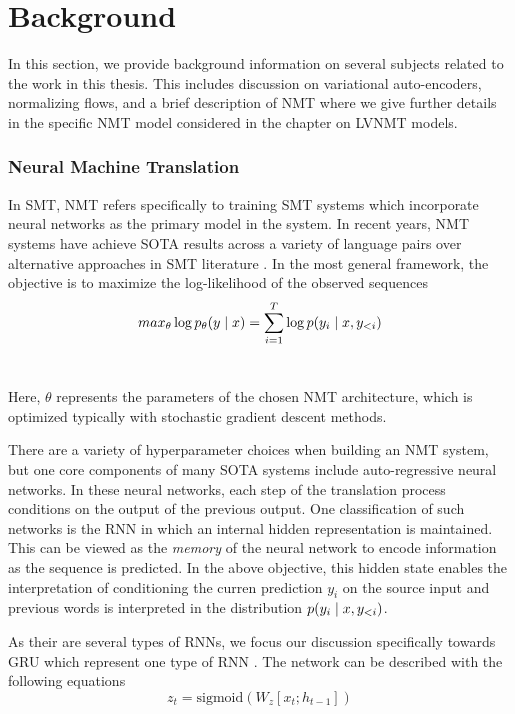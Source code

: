 \chapter{Background}

In this section, we provide background information on several subjects related to the work in this thesis. This includes discussion on variational auto-encoders, normalizing flows, and a brief description of \ac{NMT} where we give further details in the specific \ac{NMT} model considered in the chapter on \ac{LVNMT} models.  



\subsection{Neural Machine Translation}

In \ac{SMT}, \ac{NMT} refers specifically to training \ac{SMT} systems which incorporate neural networks as the primary model in the system. In recent years, \ac{NMT} systems have achieve \ac{SOTA} results across a variety of language pairs over alternative approaches in \ac{SMT} literature . In the most general framework, the objective is to maximize the log-likelihood of the observed sequences 
\begin{equation}
	max_{\theta} \log p_{\theta}(y \; | \;{x})  = \sum_{i=1}^{T} \log p(y_{i} \; | \;{x, y_{<i}})
\end{equation}\

Here, $\theta$ represents the parameters of the chosen \ac{NMT} architecture, which is optimized typically with stochastic gradient descent methods. 

There are a variety of hyperparameter choices when building an \ac{NMT} system, but one core components of many \ac{SOTA} systems include auto-regressive neural networks. In these neural networks, each step of the translation process conditions on the output of the previous output. One classification of such networks is the \ac{RNN} in which an internal hidden representation is maintained. This can be viewed as the \textit{memory} of the neural network to encode information as the sequence is predicted. In the above objective, this hidden state enables the interpretation of conditioning the curren prediction $y_{i}$ on the source input and previous words is interpreted in the distribution $p(y_{i} \; | \;{x, y_{<i}})$. 

As their are several types of \ac{RNN}s, we focus our discussion specifically towards \ac{GRU} which represent one type of \ac{RNN} \cite{cho2014GRU}. The network can be described with the following equations
\begin{equation}
	z_{t} = \text{sigmoid}(W_{z}[x_{t}; h_{t-1} ] ) %
\end{equation}

